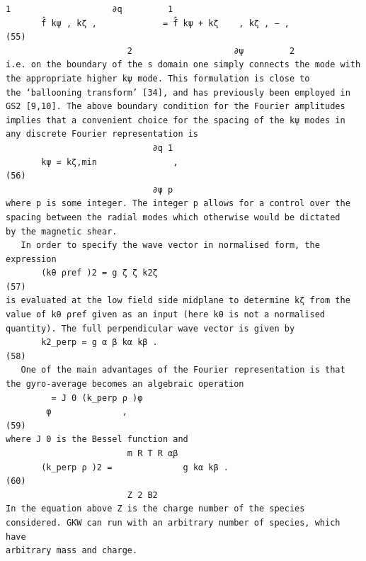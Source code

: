\documentclass[a4paper]{article}
\newcommand{\gkwpagefont}{\fontsize{6.0pt}{7.55pt}\selectfont}
\begin{document}
\begin{Verbatim}[fontsize=\gkwpagefont]
                        1                    ∂q         1
       f̂ kψ , kζ ,             = f̂ kψ + kζ    , kζ , − ,                                                                                    (55)
                        2                    ∂ψ         2
i.e. on the boundary of the s domain one simply connects the mode with the appropriate higher kψ mode. This formulation is close to
the ‘ballooning transform’ [34], and has previously been employed in GS2 [9,10]. The above boundary condition for the Fourier amplitudes
implies that a convenient choice for the spacing of the kψ modes in any discrete Fourier representation is
                             ∂q 1
       kψ = kζ,min               ,                                                                                                           (56)
                             ∂ψ p
where p is some integer. The integer p allows for a control over the spacing between the radial modes which otherwise would be dictated
by the magnetic shear.
   In order to specify the wave vector in normalised form, the expression
       (kθ ρref )2 = g ζ ζ k2ζ                                                                                                                (57)
is evaluated at the low field side midplane to determine kζ from the value of kθ ρref given as an input (here kθ is not a normalised
quantity). The full perpendicular wave vector is given by
       k2_perp = g α β kα kβ .                                                                                                     (58)
   One of the main advantages of the Fourier representation is that the gyro-average becomes an algebraic operation
         = J 0 (k_perp ρ )φ
        φ              ,                                                                                                                     (59)
where J 0 is the Bessel function and
                        m R T R αβ
       (k_perp ρ )2 =              g kα kβ .                                                                                                      (60)
                        Z 2 B2
In the equation above Z is the charge number of the species considered. GKW can run with an arbitrary number of species, which have
arbitrary mass and charge.
\end{Verbatim}
\newpage
\end{document}
